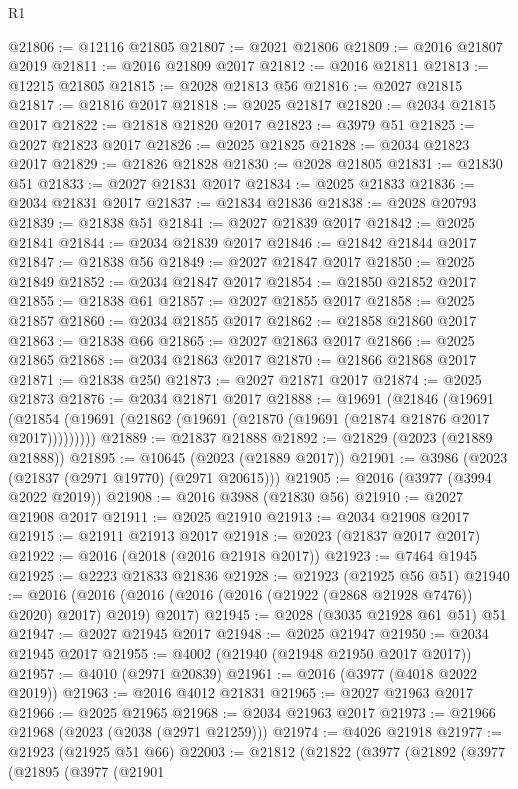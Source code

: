 \begin{lexlean}{R1}
\begin{coremodule}
@21806 := @12116 @21805
@21807 := @2021 @21806
@21809 := @2016 @21807 @2019
@21811 := @2016 @21809 @2017
@21812 := @2016 @21811
@21813 := @12215 @21805
@21815 := @2028 @21813 @56
@21816 := @2027 @21815
@21817 := @21816 @2017
@21818 := @2025 @21817
@21820 := @2034 @21815 @2017
@21822 := @21818 @21820 @2017
@21823 := @3979 @51
@21825 := @2027 @21823 @2017
@21826 := @2025 @21825
@21828 := @2034 @21823 @2017
@21829 := @21826 @21828
@21830 := @2028 @21805
@21831 := @21830 @51
@21833 := @2027 @21831 @2017
@21834 := @2025 @21833
@21836 := @2034 @21831 @2017
@21837 := @21834 @21836
@21838 := @2028 @20793
@21839 := @21838 @51
@21841 := @2027 @21839 @2017
@21842 := @2025 @21841
@21844 := @2034 @21839 @2017
@21846 := @21842 @21844 @2017
@21847 := @21838 @56
@21849 := @2027 @21847 @2017
@21850 := @2025 @21849
@21852 := @2034 @21847 @2017
@21854 := @21850 @21852 @2017
@21855 := @21838 @61
@21857 := @2027 @21855 @2017
@21858 := @2025 @21857
@21860 := @2034 @21855 @2017
@21862 := @21858 @21860 @2017
@21863 := @21838 @66
@21865 := @2027 @21863 @2017
@21866 := @2025 @21865
@21868 := @2034 @21863 @2017
@21870 := @21866 @21868 @2017
@21871 := @21838 @250
@21873 := @2027 @21871 @2017
@21874 := @2025 @21873
@21876 := @2034 @21871 @2017
@21888 := @19691
    (@21846
      (@19691 (@21854 (@19691 (@21862 (@19691 (@21870 (@19691 (@21874 @21876 @2017 @2017)))))))))
@21889 := @21837 @21888
@21892 := @21829 (@2023 (@21889 @21888))
@21895 := @10645 (@2023 (@21889 @2017))
@21901 := @3986 (@2023 (@21837 (@2971 @19770) (@2971 @20615)))
@21905 := @2016 (@3977 (@3994 @2022 @2019))
@21908 := @2016 @3988 (@21830 @56)
@21910 := @2027 @21908 @2017
@21911 := @2025 @21910
@21913 := @2034 @21908 @2017
@21915 := @21911 @21913 @2017
@21918 := @2023 (@21837 @2017 @2017)
@21922 := @2016 (@2018 (@2016 @21918 @2017))
@21923 := @7464 @1945
@21925 := @2223 @21833 @21836
@21928 := @21923 (@21925 @56 @51)
@21940 := @2016
    (@2016 (@2016 (@2016 (@2016 (@21922 (@2868 @21928 @7476)) @2020) @2017) @2019) @2017)
@21945 := @2028 (@3035 @21928 @61 @51) @51
@21947 := @2027 @21945 @2017
@21948 := @2025 @21947
@21950 := @2034 @21945 @2017
@21955 := @4002 (@21940 (@21948 @21950 @2017 @2017))
@21957 := @4010 (@2971 @20839)
@21961 := @2016 (@3977 (@4018 @2022 @2019))
@21963 := @2016 @4012 @21831
@21965 := @2027 @21963 @2017
@21966 := @2025 @21965
@21968 := @2034 @21963 @2017
@21973 := @21966 @21968 (@2023 (@2038 (@2971 @21259)))
@21974 := @4026 @21918
@21977 := @21923 (@21925 @51 @66)
@22003 := @21812
    (@21822
      (@3977
        (@21892
          (@3977
            (@21895
              (@3977
                (@21901

\end{coremodule}
\end{lexlean}

